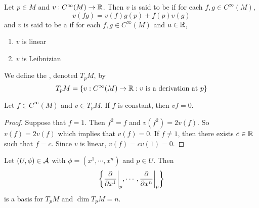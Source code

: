 \documentclass{book}
\begin{document}
	\begin{defn}
		Let $p \in M$ and $v: C^{\infty}(M) \rightarrow \mathbb{R}$. Then $v$ is said to be  if for each $f,g \in  C^{\infty}(M)$, $$v(fg) = v(f)g(p) + f(p)v(g)$$ and $v$ is said to be a  if for each $f, g \in C^{\infty}(M)$ and $a \in \mathbb{R}$,
		\begin{enumerate}
			\item $v$ is linear 
			\item $v$ is Leibnizian
		\end{enumerate}
		We define the , denoted $T_pM$, by $$T_pM = \{ v: C^{\infty}(M) \rightarrow \mathbb{R}: v \text{ is a derivation at }p\}$$
	\end{defn}

	\begin{ex}
		Let $f \in C^{\infty}(M)$ and $v \in T_pM$. If $f$ is constant, then $vf = 0$.
	\end{ex}

	\begin{proof}
		Suppose that $f = 1$. Then $f^2 = f$ and $v(f^2) = 2v(f)$. So $v(f) = 2v(f)$ which implies that $v(f) = 0$. If $f \neq 1$, then there exists $c \in \mathbb{R}$ such that $f = c$. Since $v$ is linear, $v(f) = cv(1) = 0$.
	\end{proof}

	\begin{ex}
		Let $(U, \phi) \in \mathcal{A}$ with $\phi = (x^1, \cdots, x^n)$ and $p \in U$. Then $$ \bigg \{\frac{\partial}{\partial x^1} \bigg|_p, \cdots, \frac{\partial}{\partial x^n} \bigg|_p \bigg \}$$ is a basis for $T_pM$ and $\dim T_pM = n$.
	\end{ex}
\end{document}
